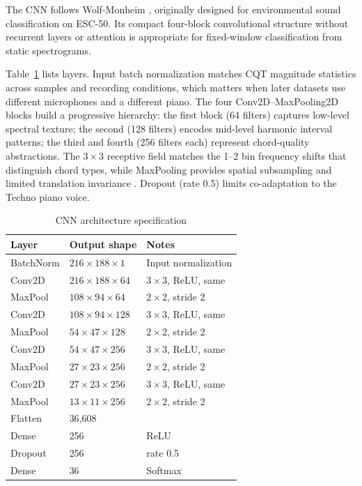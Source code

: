 \documentclass[pdflatex,sn-mathphys-num,iicol]{sn-jnl}
\theoremstyle{thmstyleone}
\theoremstyle{thmstyletwo}
\theoremstyle{thmstylethree}
\begin{document}
The CNN follows Wolf-Monheim \cite{Wolf-Monheim2025}, originally designed for environmental sound classification on ESC-50. Its compact four-block convolutional structure without recurrent layers or attention is appropriate for fixed-window classification from static spectrograms.

Table~\ref{tab:cnn-architecture} lists layers. Input batch normalization matches CQT magnitude statistics across samples and recording conditions, which matters when later datasets use different microphones and a different piano. The four Conv2D--MaxPooling2D blocks build a progressive hierarchy: the first block (64 filters) captures low-level spectral texture; the second (128 filters) encodes mid-level harmonic interval patterns; the third and fourth (256 filters each) represent chord-quality abstractions. The $3\times3$ receptive field matches the 1--2 bin frequency shifts that distinguish chord types, while MaxPooling provides spatial subsampling and limited translation invariance \cite{Purwono2022}. Dropout (rate 0.5) limits co-adaptation to the Techno piano voice.

\begin{table}[t]
\caption{CNN architecture specification}\label{tab:cnn-architecture}
\begin{tabularx}{\columnwidth}{@{}lXl@{}}
\toprule
Layer & Output shape & Notes \\
\midrule
BatchNorm & $216{\times}188{\times}1$ & Input normalization \\
Conv2D & $216{\times}188{\times}64$ & $3{\times}3$, ReLU, same \\
MaxPool & $108{\times}94{\times}64$ & $2{\times}2$, stride 2 \\
Conv2D & $108{\times}94{\times}128$ & $3{\times}3$, ReLU, same \\
MaxPool & $54{\times}47{\times}128$ & $2{\times}2$, stride 2 \\
Conv2D & $54{\times}47{\times}256$ & $3{\times}3$, ReLU, same \\
MaxPool & $27{\times}23{\times}256$ & $2{\times}2$, stride 2 \\
Conv2D & $27{\times}23{\times}256$ & $3{\times}3$, ReLU, same \\
MaxPool & $13{\times}11{\times}256$ & $2{\times}2$, stride 2 \\
Flatten & 36{,}608 & \\
Dense & 256 & ReLU \\
Dropout & 256 & rate 0.5 \\
Dense & 36 & Softmax \\
\bottomrule
\end{tabularx}
\end{table}
\end{document}
